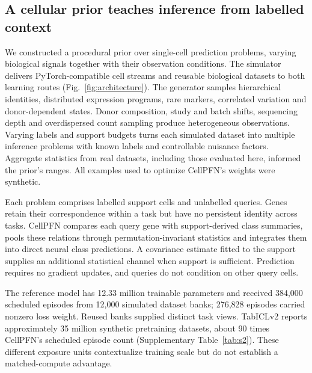 \subsection*{A cellular prior teaches inference from labelled context}

We constructed a procedural prior over single-cell prediction problems, varying biological signals together with their observation conditions. The simulator delivers PyTorch-compatible cell streams and reusable biological datasets to both learning routes (Fig.~\ref{fig:architecture}). The generator samples hierarchical identities, distributed expression programs, rare markers, correlated variation and donor-dependent states. Donor composition, study and batch shifts, sequencing depth and overdispersed count sampling produce heterogeneous observations. Varying labels and support budgets turns each simulated dataset into multiple inference problems with known labels and controllable nuisance factors. Aggregate statistics from real datasets, including those evaluated here, informed the prior's ranges. All examples used to optimize CellPFN's weights were synthetic.

Each problem comprises labelled support cells and unlabelled queries. Genes retain their correspondence within a task but have no persistent identity across tasks. CellPFN compares each query gene with support-derived class summaries, pools these relations through permutation-invariant statistics\cite{zaheer2017deepsets} and integrates them into direct neural class predictions. A covariance estimate fitted to the support supplies an additional statistical channel when support is sufficient. Prediction requires no gradient updates, and queries do not condition on other query cells.

The reference model has 12.33 million trainable parameters and received 384,000 scheduled episodes from 12,000 simulated dataset banks; 276,828 episodes carried nonzero loss weight. Reused banks supplied distinct task views. TabICLv2 reports approximately 35 million synthetic pretraining datasets\cite{qu2026tabiclv2}, about 90 times CellPFN's scheduled episode count (Supplementary Table~\ref{tab:s2}). These different exposure units contextualize training scale but do not establish a matched-compute advantage.

